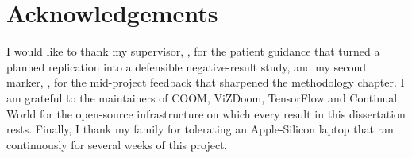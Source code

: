 \cleardoublepage
\chapter*{Acknowledgements}
\thispagestyle{personal}        %

I would like to thank my supervisor, \supervisorname, for the
patient guidance that turned a planned replication into a
defensible negative-result study, and my second marker,
\moduleassessor, for the mid-project feedback that sharpened the
methodology chapter. I am grateful to the maintainers of COOM,
ViZDoom, TensorFlow and Continual World for the open-source
infrastructure on which every result in this dissertation rests.
Finally, I thank my family for tolerating an Apple-Silicon laptop
that ran continuously for several weeks of this project.
